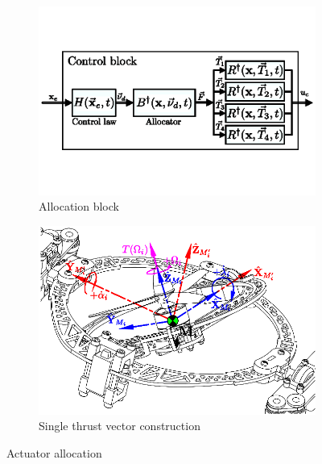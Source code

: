 \begin{figure}[htbp]
\vspace{-6pt}
\centering
\begin{subfigure}{0.48\textwidth}
\centering
\includegraphics[width=\textwidth]{figs/allocator-block}
\vspace{-12pt}
\caption{Allocation block}
\label{fig:allocation-block}
\end{subfigure}
\begin{subfigure}{0.48\textwidth}
\centering
\includegraphics[width=\textwidth]{figs/force-redirect}
\vspace{-12pt}
\caption{Single thrust vector construction}
\label{fig:allocation-redirect}
\end{subfigure}
\vspace{-6pt}
\caption{Actuator allocation}
\vspace{-18pt}
\end{figure}
